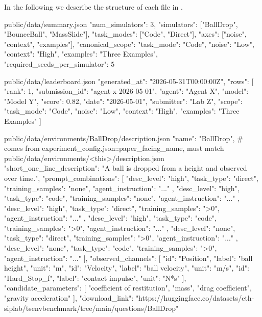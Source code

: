 \documentclass[11pt]{article}
\begin{document}
In the following we describe the structure of each file in .
\label{sec:website-summary-json}
\begin{DocCode}
public/data/summary.json
{
  "num_simulators": 3,
  "simulators": ["BallDrop", "BounceBall", "MassSlide"],
  "task_modes": ["Code", "Direct"],
  "axes": ["noise", "context", "examples"],
  "canonical_scope": {
    "task_mode": "Code",
    "noise": "Low",
    "context": "High",
    "examples": "Three Examples",
    "required_seeds_per_simulator": 5
  }
}
\end{DocCode}
\label{sec:website-leaderboard-json}
\begin{DocCode}
public/data/leaderboard.json
{
  "generated_at": "2026-05-31T00:00:00Z",
  "rows": [
    {
      "rank": 1,
      "submission_id": "agent-x-2026-05-01",
      "agent": "Agent X",
      "model": "Model Y",
      "score": 0.82,
      "date": "2026-05-01",
      "submitter": "Lab Z",
      "scope": {
        "task_mode": "Code",
        "noise": "Low",
        "context": "High",
        "examples": "Three Examples"
      }
    }
  ]
}
\end{DocCode}
\label{sec:website-environment-description-json}
\begin{DocCode}
public/data/environments/BallDrop/description.json
{
  "name": "BallDrop", # comes from experiment_config.json::paper_facing_name, must match public/data/environments/<this>/description.json
  "short_one_line_description": "A ball is dropped from a height and observed over time.",
  "prompt_combinations": [
    {
      "desc_level": "high",
      "task_type": "direct",
      "training_samples": "none",
      "agent_instruction": "..."
    },
    {
      "desc_level": "high",
      "task_type": "code",
      "training_samples": "none",
      "agent_instruction": "..."
    },
    {
      "desc_level": "high",
      "task_type": "direct",
      "training_samples": ">0",
      "agent_instruction": "..."
    },
    {
      "desc_level": "high",
      "task_type": "code",
      "training_samples": ">0",
      "agent_instruction": "..."
    },
    {
      "desc_level": "none",
      "task_type": "direct",
      "training_samples": ">0",
      "agent_instruction": "..."
    },
    {
      "desc_level": "none",
      "task_type": "code",
      "training_samples": ">0",
      "agent_instruction": "..."
    }
  ],
  "observed_channels": [
    {"id": "Position", "label": "ball height", "unit": "m"},
    {"id": "Velocity", "label": "ball velocity", "unit": "m/s"},
    {"id": "Hard_Stop_f", "label": "contact impulse", "unit": "N*s"}
  ],
  "candidate_parameters": [
    "coefficient of restitution",
    "mass",
    "drag coefficient",
    "gravity acceleration"
  ],
  "download_link": "https://huggingface.co/datasets/eth-siplab/tsenvbenchmark/tree/main/questions/BallDrop"
}
\end{DocCode}
\end{document}
